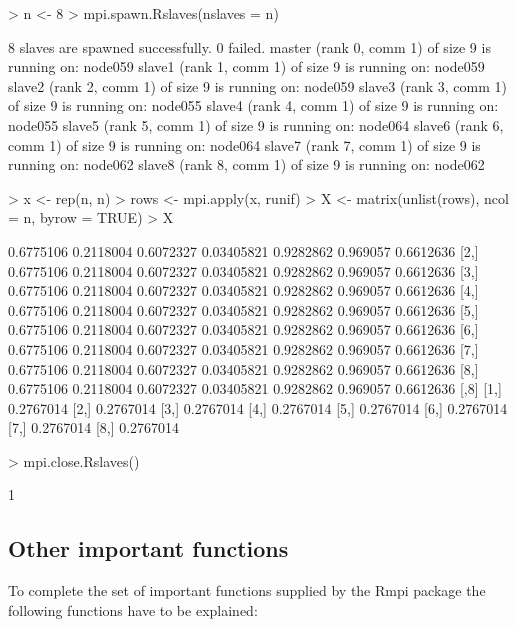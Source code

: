 \begin{Schunk}
\begin{Sinput}
> n <- 8
> mpi.spawn.Rslaves(nslaves = n)
\end{Sinput}
\begin{Soutput}
	8 slaves are spawned successfully. 0 failed.
master (rank 0, comm 1) of size 9 is running on: node059 
slave1 (rank 1, comm 1) of size 9 is running on: node059 
slave2 (rank 2, comm 1) of size 9 is running on: node059 
slave3 (rank 3, comm 1) of size 9 is running on: node055 
slave4 (rank 4, comm 1) of size 9 is running on: node055 
slave5 (rank 5, comm 1) of size 9 is running on: node064 
slave6 (rank 6, comm 1) of size 9 is running on: node064 
slave7 (rank 7, comm 1) of size 9 is running on: node062 
slave8 (rank 8, comm 1) of size 9 is running on: node062 
\end{Soutput}
\begin{Sinput}
> x <- rep(n, n)
> rows <- mpi.apply(x, runif)
> X <- matrix(unlist(rows), ncol = n, byrow = TRUE)
> X
\end{Sinput}
\begin{Soutput}
          [,1]      [,2]      [,3]       [,4]      [,5]     [,6]      [,7]
[1,] 0.6775106 0.2118004 0.6072327 0.03405821 0.9282862 0.969057 0.6612636
[2,] 0.6775106 0.2118004 0.6072327 0.03405821 0.9282862 0.969057 0.6612636
[3,] 0.6775106 0.2118004 0.6072327 0.03405821 0.9282862 0.969057 0.6612636
[4,] 0.6775106 0.2118004 0.6072327 0.03405821 0.9282862 0.969057 0.6612636
[5,] 0.6775106 0.2118004 0.6072327 0.03405821 0.9282862 0.969057 0.6612636
[6,] 0.6775106 0.2118004 0.6072327 0.03405821 0.9282862 0.969057 0.6612636
[7,] 0.6775106 0.2118004 0.6072327 0.03405821 0.9282862 0.969057 0.6612636
[8,] 0.6775106 0.2118004 0.6072327 0.03405821 0.9282862 0.969057 0.6612636
          [,8]
[1,] 0.2767014
[2,] 0.2767014
[3,] 0.2767014
[4,] 0.2767014
[5,] 0.2767014
[6,] 0.2767014
[7,] 0.2767014
[8,] 0.2767014
\end{Soutput}
\begin{Sinput}
> mpi.close.Rslaves()
\end{Sinput}
\begin{Soutput}
[1] 1
\end{Soutput}
\end{Schunk}


\subsection{Other important functions}

To complete the set of important functions supplied by the Rmpi
package the following functions have to be explained:

